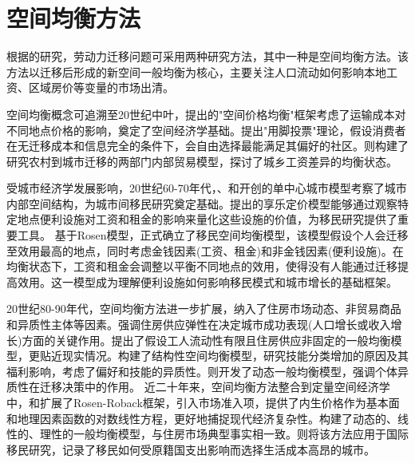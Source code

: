 \documentclass[a4paper, zihao=-4, fontset = mac, oneside]{ctexbook} %
\begin{document}
\section{空间均衡方法}

根据\textcite{jiaEconomicsInternalMigration2023}的研究，劳动力迁移问题可采用两种研究方法，其中一种是空间均衡方法。该方法以迁移后形成的新空间一般均衡为核心，主要关注人口流动如何影响本地工资、区域房价等变量的市场出清。

空间均衡概念可追溯至20世纪中叶，\textcite{samuelsonSpatialPriceEquilibrium1952}提出的"空间价格均衡"框架考虑了运输成本对不同地点价格的影响，奠定了空间经济学基础。\textcite{tieboutPureTheoryLocal1956}提出"用脚投票"理论，假设消费者在无迁移成本和信息完全的条件下，会自由选择最能满足其偏好的社区。\textcite{harrisMigrationUnemploymentDevelopment1970}则构建了研究农村到城市迁移的两部门内部贸易模型，探讨了城乡工资差异的均衡状态。

受城市经济学发展影响，20世纪60-70年代，\textcite{alonsoLocationLandUse1964}、\textcite{muthCitiesHousingSpatial1969}和\textcite{millsAggregativeModelResource1967}开创的单中心城市模型考察了城市内部空间结构，为城市间移民研究奠定基础。\textcite{rosenHedonicPricesImplicit1974}提出的享乐定价模型能够通过观察特定地点便利设施对工资和租金的影响来量化这些设施的价值，为移民研究提供了重要工具。
基于Rosen模型，\textcite{robackWagesRentsQuality1982}正式确立了移民空间均衡模型，该模型假设个人会迁移至效用最高的地点，同时考虑金钱因素(工资、租金)和非金钱因素(便利设施)。在均衡状态下，工资和租金会调整以平衡不同地点的效用，使得没有人能通过迁移提高效用。这一模型成为理解便利设施如何影响移民模式和城市增长的基础框架。

20世纪80-90年代，空间均衡方法进一步扩展，纳入了住房市场动态、非贸易商品和异质性主体等因素。\textcite{glaeserWealthCitiesAgglomeration2009}强调住房供应弹性在决定城市成功表现(人口增长或收入增长)方面的关键作用。\textcite{morettiLocalLaborMarkets2011}提出了假设工人流动性有限且住房供应非固定的一般均衡模型，更贴近现实情况。\textcite{diamondDeterminantsWelfareImplications2016}构建了结构性空间均衡模型，研究技能分类增加的原因及其福利影响，考虑了偏好和技能的异质性。\textcite{coen-piraniEffectHouseholdAppliances2010}则开发了动态一般均衡模型，强调个体异质性在迁移决策中的作用。
近二十年来，空间均衡方法整合到定量空间经济学中，\textcite{ahlfeldtEconomicsDensityEvidence2015}和\textcite{reddingQuantitativeSpatialEconomics2017}扩展了Rosen-Roback框架，引入市场准入项，提供了内生价格作为基本面和地理因素函数的对数线性方程，更好地捕捉现代经济复杂性。\textcite{glaeserHousingDynamicsUrban2014}构建了动态的、线性的、理性的一般均衡模型，与住房市场典型事实相一致。\textcite{albertImmigrationSpatialEquilibrium2022}则将该方法应用于国际移民研究，记录了移民如何受原籍国支出影响而选择生活成本高昂的城市。
\end{document}
